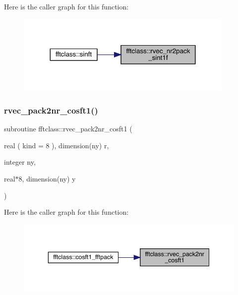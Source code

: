 Here is the caller graph for this function\+:\nopagebreak
\begin{figure}[H]
\begin{center}
\leavevmode
\includegraphics[width=299pt]{namespacefftclass_ae1f9bdd4e66db530852187dff115ae36_icgraph}
\end{center}
\end{figure}
\mbox{\label{namespacefftclass_a8f3b38a9f0433b6b847b670b98acab99}} 
\subsubsection{\texorpdfstring{rvec\_pack2nr\_cosft1()}{rvec\_pack2nr\_cosft1()}}
{\footnotesize\ttfamily subroutine fftclass\+::rvec\+\_\+pack2nr\+\_\+cosft1 (\begin{DoxyParamCaption}\item[{real ( kind = 8 ), dimension(ny)}]{r,  }\item[{integer}]{ny,  }\item[{real$\ast$8, dimension(ny)}]{y }\end{DoxyParamCaption})}

Here is the caller graph for this function\+:\nopagebreak
\begin{figure}[H]
\begin{center}
\leavevmode
\includegraphics[width=343pt]{namespacefftclass_a8f3b38a9f0433b6b847b670b98acab99_icgraph}
\end{center}
\end{figure}
\mbox{\label{namespacefftclass_a5b968c02330134b7f60b0b19e3192e77}} 
